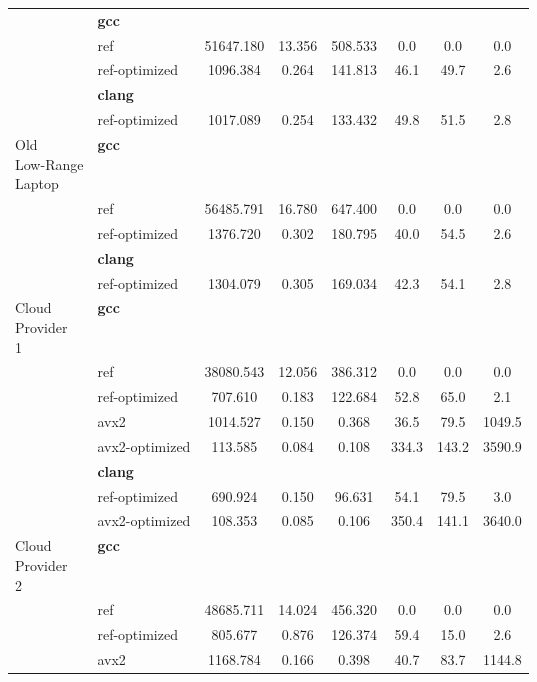 \begin{table}[H]
\begin{tabularx}{\linewidth}{l l c c c c c c}
          & \textbf{gcc} & & & & & \\
          & ref & 51647.180 & 13.356 & 508.533 & 0.0 & 0.0 & 0.0\\
          & ref-optimized & 1096.384 & 0.264 & 141.813 & 46.1 & 49.7 & 2.6\\
          & \textbf{clang} & & & & & \\
          & ref-optimized & 1017.089 & 0.254 & 133.432 & 49.8 & 51.5 & 2.8\\
          \midrule
          \multirowcell{5}{Old\\ Low-Range\\ Laptop}
          & \textbf{gcc} & & & & & \\
          & ref & 56485.791 & 16.780 & 647.400 & 0.0 & 0.0 & 0.0\\
          & ref-optimized & 1376.720 & 0.302 & 180.795 & 40.0 & 54.5 & 2.6\\
          & \textbf{clang} & & & & & \\
          & ref-optimized & 1304.079 & 0.305 & 169.034 & 42.3 & 54.1 & 2.8\\
          \midrule
          \multirowcell{8}{Cloud\\ Provider\\ 1}
          & \textbf{gcc} & & & & & \\
          & ref & 38080.543 & 12.056 & 386.312 & 0.0 & 0.0 & 0.0\\
          & ref-optimized & 707.610 & 0.183 & 122.684 & 52.8 & 65.0 & 2.1\\
          & avx2 & 1014.527 & 0.150 & 0.368 & 36.5 & 79.5 & 1049.5\\
          & avx2-optimized & 113.585 & 0.084 & 0.108 & 334.3 & 143.2 & 3590.9\\
          & \textbf{clang} & & & & & \\
          & ref-optimized & 690.924 & 0.150 & 96.631 & 54.1 & 79.5 & 3.0\\
          & avx2-optimized & 108.353 & 0.085 & 0.106 & 350.4 & 141.1 & 3640.0\\
          \midrule
          \multirowcell{8}{Cloud\\ Provider\\ 2}
          & \textbf{gcc} & & & & & \\
          & ref & 48685.711 & 14.024 & 456.320 & 0.0 & 0.0 & 0.0\\
          & ref-optimized & 805.677 & 0.876 & 126.374 & 59.4 & 15.0 & 2.6\\
          & avx2 & 1168.784 & 0.166 & 0.398 & 40.7 & 83.7 & 1144.8\\

\end{tabularx}
\end{table}
